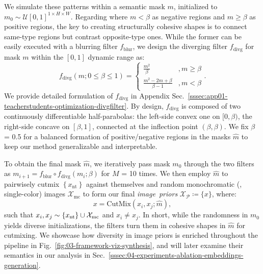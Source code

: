 \begin{foldable} %
    We simulate these patterns within a semantic mask $m$, initialized to $m_{0} \sim \mathcal{U}\left[0,1\right]^{1 \times H \times W}$.
    Regarding where $m < \beta$ as negative regions and $m \ge \beta$ as positive regions, the key to creating structurally cohesive shapes is to connect same-type regions but contrast opposite-type ones.
    While the former can be easily executed with a blurring filter $f_{\text{blur}}$, we design the diverging filter $f_{\text{divg}}$ for mask $m$ within the $\left[0,1\right]$ dynamic range as:
    \begin{equation} \label{eq:synthesis-diverging-filter}
        f_{\text{divg}}\left(m;0\le\beta\le1\right)=\begin{cases}
            \frac{m^{2}}{\beta}                & , m \ge \beta \\
            \frac{m^{2} - 2m + \beta}{\beta-1} & , m < \beta
        \end{cases}.
    \end{equation}
    We provide detailed formulation of $f_{\text{divg}}$ in Appendix Sec.~\ref{sssec:app01-teacherstudents-optimization-divgfilter}.
    By design, $f_{\text{divg}}$ is composed of two continuously differentiable half-parabolas: the left-side convex one on $[0,\beta)$, the right-side concave on $\left[\beta,1\right]$, connected at the inflection point $\left(\beta,\beta\right)$.
    We fix $\beta$ = 0.5 for a balanced formation of positive/negative regions in the masks $\hat{m}$ to keep our method generalizable and interpretable. 
\end{foldable}


\begin{foldable}
    To obtain the final mask $\hat{m}$, we iteratively pass mask $m_0$ through the two filters as $m_{i+1}=f_{\text{blur}} \circ f_{\text{divg}}\left(m_{i};\beta\right)$ for $M$ = 10 times.
    We then employ $\hat{m}$ to pairwisely cutmix $\left\{ x_{\text{nt}}\right\}$ against themselves and random monochromatic (\ie, single-color) images $\mathcal{X}_{\text{mc}}$ to form our final \textit{image~priors} $\mathcal{X}_\mathcal{P} \coloneq \{x\}$, where:
    \begin{equation} \label{eq:synthesis-semcutmix}
        x=\text{CutMix}\left(x_{i},x_{j};\hat{m}\right),
    \end{equation}
    such that $x_{i},x_{j} \sim \left\{ x_{\text{nt}}\right\} \cup \mathcal{X}_{\text{\text{mc}}}$ and $x_{i} \ne x_{j}$.
    In short, while the randomness in $m_{0}$ yields diverse initializations, the filters turn them in cohesive shapes in $\hat{m}$ for cutmixing.
    We showcase how diversity in image priors is enriched throughout the pipeline in Fig.~\ref{fig:03-framework-viz-synthesis}, and will later examine their semantics in our analysis in Sec.~\ref{sssec:04-experiments-ablation-embeddings-generation}.
\end{foldable}

